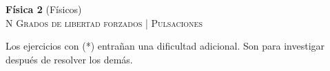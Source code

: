 \documentclass[11pt,spanish,a4paper]{article}
\begin{document}
\begin{center}
\textbf{Física 2} (Físicos) \hfill {}\\
	\textsc{\LARGE N Grados de libertad forzados | Pulsaciones}
\end{center}

Los ejercicios con (*) entrañan una dificultad adicional. Son para investigar después de resolver los demás.



\begin{enumerate}



								



\end{enumerate}
\end{document}
